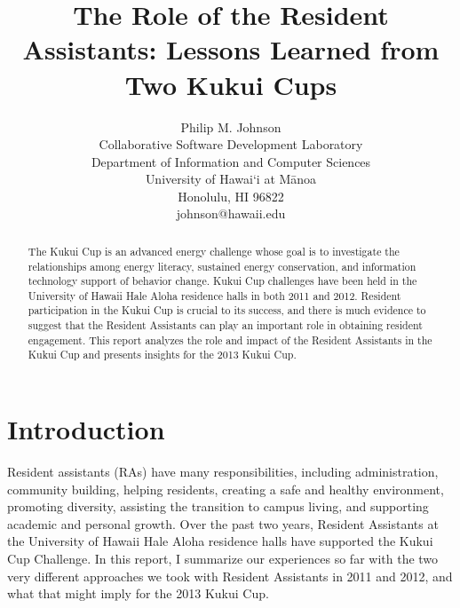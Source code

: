 \documentclass[]{article}
\begin{document}


\title{{\bf The Role of the Resident Assistants: Lessons Learned from Two Kukui Cups}}

\author{Philip M. Johnson\\
        Collaborative Software Development Laboratory\\
        Department of Information and Computer Sciences\\
        University of Hawai`i at M\=anoa\\
        Honolulu, HI 96822\\
        johnson@hawaii.edu\\
}


\maketitle

\begin{abstract}  %
The Kukui Cup is an advanced energy challenge whose goal is to
investigate the relationships among energy literacy, sustained energy
conservation, and information technology support of behavior change. Kukui Cup
challenges have been held in the University of Hawaii Hale Aloha residence halls in both
2011 and 2012.  Resident participation in the Kukui Cup is crucial to its success, and
there is much evidence to suggest that the Resident Assistants can play an important role in
obtaining resident engagement. This report analyzes the role and impact of the Resident
Assistants in the Kukui Cup and presents insights for the 2013 Kukui Cup.
\end{abstract}

\tableofcontents
\newpage
\thispagestyle{empty}


\setlength{\parskip}{3pt plus 1pt minus 1pt} 

\section{Introduction}

Resident assistants (RAs) have many responsibilities, including administration, community
building, helping residents, creating a safe and healthy environment, promoting diversity,
assisting the transition to campus living, and supporting academic and personal growth.
Over the past two years, Resident Assistants at the University of Hawaii Hale Aloha
residence halls have supported the Kukui Cup Challenge.  In this report, I summarize our
experiences so far with the two very different approaches we took with Resident Assistants in
2011 and 2012, and what that might imply for the 2013 Kukui Cup.
\end{document}
